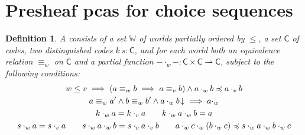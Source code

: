 \documentclass[11pt]{article}
\newtheorem{defn}[thrm]{Definition}
\begin{document}

\newpage

\section{Presheaf pcas for choice sequences}

\begin{defn}\label{defn-choice-sequence-pca-gadget}
  A  consists of a set \(\mathbb{W}\) of worlds
  partially ordered by \(\leq\), a set \(\mathsf{C}\) of codes, two
  distinguished codes \(k\ s : \mathsf{C}\), and for each world both an
  equivalence relation \({\equiv_{w}}\) on \(\mathsf{C}\) and a partial function
  \(- \cdot_{w} - : \mathsf{C} \times \mathsf{C} \rightharpoonup \mathsf{C}\),
  subject to the following conditions:
  \begin{gather}
    w \leq v \implies (a \equiv_{w}b  \implies a \equiv_{v} b) \land {a \cdot_{w} b}\preccurlyeq{a \cdot_{v} b}\\
    a \equiv_{w} a' \land b \equiv_{w} b' \land {{a \cdot_{w} b}\!\downarrow}
        \implies a \cdot_{w}  \\
    k \cdot_{w} a = k \cdot_{v} a \qquad
    k \cdot_{w} a \cdot_{w} b = a \\
    s \cdot_{w} a = s \cdot_{v} a \qquad
    s \cdot_{w} a \cdot_{w} b = s \cdot_{v} a \cdot_{v} b \qquad
    {a \cdot_{w} c \cdot_{w} (b \cdot_{w} c)}\preccurlyeq{s \cdot_{w} a \cdot_{w} b \cdot_{w} c}
  \end{gather}
\end{defn}
\end{document}
